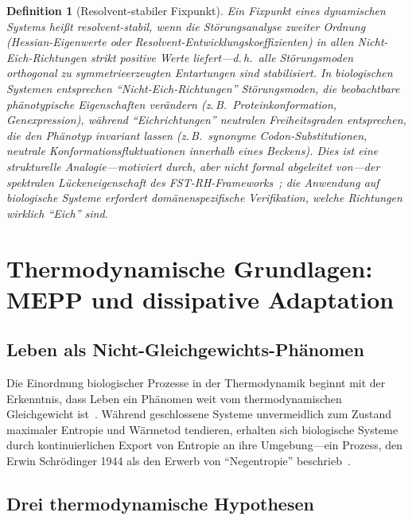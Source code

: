 \documentclass[12pt,a4paper]{article}
\newtheorem{definition}{Definition}
\theoremstyle{remark}
\begin{document}
\begin{definition}[Resolvent-stabiler Fixpunkt]
\label{def:resolvent-stable}
Ein Fixpunkt eines dynamischen Systems heißt \emph{resolvent-stabil}, wenn die Störungsanalyse zweiter Ordnung (Hessian-Eigenwerte oder Resolvent-Entwicklungskoeffizienten) in allen Nicht-Eich-Richtungen strikt positive Werte liefert---d.\,h.\ alle Störungsmoden orthogonal zu symmetrieerzeugten Entartungen sind stabilisiert. In biologischen Systemen entsprechen ``Nicht-Eich-Richtungen'' Störungsmoden, die beobachtbare phänotypische Eigenschaften verändern (z.\,B.\ Proteinkonformation, Genexpression), während ``Eichrichtungen'' neutralen Freiheitsgraden entsprechen, die den Phänotyp invariant lassen (z.\,B.\ synonyme Codon-Substitutionen, neutrale Konformationsfluktuationen innerhalb eines Beckens). Dies ist eine strukturelle Analogie---motiviert durch, aber nicht formal abgeleitet von---der spektralen Lückeneigenschaft des FST-RH-Frameworks~\citep{GeigerRH2026b}; die Anwendung auf biologische Systeme erfordert domänenspezifische Verifikation, welche Richtungen wirklich ``Eich'' sind.
\end{definition}

\section{Thermodynamische Grundlagen: MEPP und dissipative Adaptation}
\label{sec:thermodynamics}

\subsection{Leben als Nicht-Gleichgewichts-Phänomen}

Die Einordnung biologischer Prozesse in der Thermodynamik beginnt mit der Erkenntnis, dass Leben ein Phänomen weit vom thermodynamischen Gleichgewicht ist~\citep{EcosystemMEPP}. Während geschlossene Systeme unvermeidlich zum Zustand maximaler Entropie und Wärmetod tendieren, erhalten sich biologische Systeme durch kontinuierlichen Export von Entropie an ihre Umgebung---ein Prozess, den Erwin Schrödinger 1944 als den Erwerb von ``Negentropie'' beschrieb~\citep{SchoolBiologicalPhysics,EcosystemMEPP,Kuzu2025}.

\subsection{Drei thermodynamische Hypothesen}
\end{document}
